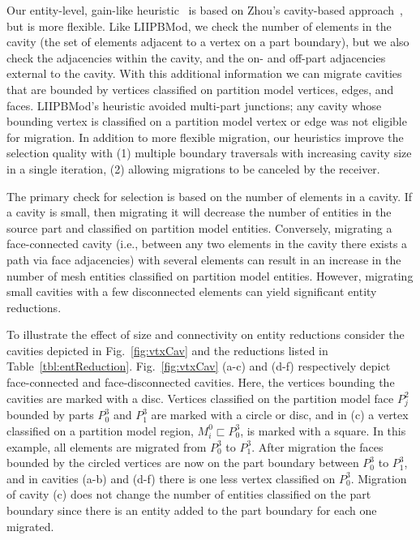Our entity-level, gain-like heuristic~\cite{Fiduccia1982,Kernighan1970} is based
on Zhou's cavity-based approach~\cite{Zhou2010,zhou2012unstructured}, but is
more flexible.
Like LIIPBMod, we check the number of elements in the cavity (the set
of elements adjacent to a vertex on a part boundary), but we also
check the adjacencies within the cavity, and the on- and off-part adjacencies
external to the cavity.
With this additional information we can migrate cavities that are bounded by
vertices classified on partition model vertices, edges, and faces.
\mbox{LIIPBMod's} heuristic avoided multi-part junctions; any cavity whose bounding
vertex is classified on a partition model vertex or edge was not eligible for
migration.
In addition to more flexible migration, our heuristics improve the selection
quality with (1) multiple boundary traversals with increasing cavity size in a
single iteration, (2) allowing migrations to be canceled by the receiver.

The primary check for selection is based on the number of elements in a cavity.
If a cavity is small, then migrating it will decrease the number of entities in
the source part and classified on partition model entities.
Conversely, migrating a face-connected cavity (i.e., between any two elements in
the cavity there exists a path via face adjacencies) with several elements can
result in an increase in the number of mesh entities classified on partition
model entities.
However, migrating small cavities with a few disconnected elements can yield
significant entity reductions.

To illustrate the effect of size and connectivity on entity reductions consider the
cavities depicted in Fig.~\ref{fig:vtxCav} and the reductions listed in
Table~\ref{tbl:entReduction}.
Fig.~\ref{fig:vtxCav} (a-c) and (d-f) respectively depict face-connected and
face-disconnected cavities.
Here, the vertices bounding the cavities are marked with a disc.
Vertices classified on the partition model face $P^2_j$ bounded by parts $P^3_0$
and $P^3_1$ are marked with a circle or disc, and in (c) a vertex classified on a partition
model region, $M^0_i \sqsubset P^3_0$, is marked with a square.
In this example, all elements are migrated from $P^3_0$ to $P^3_1$.
After migration the faces bounded by the circled vertices are now on the part
boundary between $P^3_0$ to $P^3_1$, and in cavities (a-b) and (d-f) there is
one less vertex classified on $P^3_0$.
Migration of cavity (c) does not change the number of entities classified
on the part boundary since there is an entity added to the part boundary
for each one migrated.


